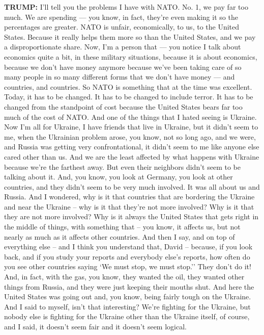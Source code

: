 \textbf{TRUMP:} I'll tell you the problems I have with NATO. No. 1, we
pay far too much. We are spending --- you know, in fact, they're even
making it so the percentages are greater. NATO is unfair, economically,
to us, to the United States. Because it really helps them more so than
the United States, and we pay a disproportionate share. Now, I'm a
person that --- you notice I talk about economics quite a bit, in these
military situations, because it is about economics, because we don't
have money anymore because we've been taking care of so many people in
so many different forms that we don't have money --- and countries, and
countries. So NATO is something that at the time was excellent. Today,
it has to be changed. It has to be changed to include terror. It has to
be changed from the standpoint of cost because the United States bears
far too much of the cost of NATO. And one of the things that I hated
seeing is Ukraine. Now I'm all for Ukraine, I have friends that live in
Ukraine, but it didn't seem to me, when the Ukrainian problem arose, you
know, not so long ago, and we were, and Russia was getting very
confrontational, it didn't seem to me like anyone else cared other than
us. And we are the least affected by what happens with Ukraine because
we're the farthest away. But even their neighbors didn't seem to be
talking about it. And, you know, you look at Germany, you look at other
countries, and they didn't seem to be very much involved. It was all
about us and Russia. And I wondered, why is it that countries that are
bordering the Ukraine and near the Ukraine -- why is it that they're not
more involved? Why is it that they are not more involved? Why is it
always the United States that gets right in the middle of things, with
something that -- you know, it affects us, but not nearly as much as it
affects other countries. And then I say, and on top of everything else
-- and I think you understand that, David -- because, if you look back,
and if you study your reports and everybody else's reports, how often do
you see other countries saying `We must stop, we must stop.'' They don't
do it! And, in fact, with the gas, you know, they wanted the oil, they
wanted other things from Russia, and they were just keeping their mouths
shut. And here the United States was going out and, you know, being
fairly tough on the Ukraine. And I said to myself, isn't that
interesting? We're fighting for the Ukraine, but nobody else is fighting
for the Ukraine other than the Ukraine itself, of course, and I said, it
doesn't seem fair and it doesn't seem logical.

